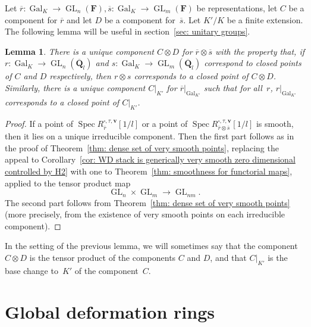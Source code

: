 \documentclass{amsart}
\renewcommand{\mathbb}{\mathbf}
\renewcommand{\ell}{l}
\newtheorem{lem}[subsubsection]{Lemma}
\theoremstyle{definition}
\theoremstyle{remark}
\newcommand{\mar}[1]{}
\newcommand{\mar}[1]{\marginpar{\raggedright\tiny squirrel #1}}
\newcommand{\F}{\FF}
\newcommand{\Q}{\QQ}
\newcommand{\FF}{{\mathbb F}}
\newcommand{\QQ}{{\mathbb Q}}
\newcommand{\Qbar}{\overline{\Q}}
\newcommand{\Qlbar}{\Qbar_{\ell}}
\DeclareMathOperator{\Gal}{Gal}
\DeclareMathOperator{\GL}{GL}
\DeclareMathOperator{\Spec}{Spec}
\newcommand{\rbar}{\overline{r}}
\newcommand{\sbar}{\overline{s}}
\begin{document}
Let $\rbar:\Gal_K\to\GL_n(\F),\sbar:\Gal_K\to\GL_m(\F)$ be representations, let $C$ be a
component for $\rbar$ and let $D$ be a component for~$\sbar$. Let
$K'/K$ be a finite extension. The following lemma will be useful in section~\ref{sec: unitary groups}.
\begin{lem}%
  \label{lem: operations on components make sense}There is a unique
  component $C\otimes D$ for $\rbar\otimes\sbar$ with the property
  that, if $r:\Gal_K\to\GL_n(\Qlbar)$ and $s:\Gal_K\to\GL_m(\Qlbar)$
  correspond to closed points of $C$ and $D$ respectively, then
  $r\otimes s$ corresponds to a closed point of
  $C\otimes D$. Similarly, there is a unique  component
  $C|_{K'}$ for $\rbar|_{\Gal_{K'}}$ such that for all~$r$, $r|_{\Gal_{K'}}$ corresponds
  to a closed point of $C|_{K'}$.
\end{lem}
\begin{proof}%
  If a point of $\Spec R_{\rbar}^{\square,\tau,\mathbf{v}}[1/l]$ or a point of $\Spec R_{\rbar\otimes \sbar}^{\square,\tau,\mathbf{v}}[1/l]$ is smooth, then it lies on a unique irreducible component.  Then the first part  follows as in the proof of Theorem~\ref{thm: dense
    set of very smooth points}, replacing the appeal to Corollary~\ref{cor: WD stack is generically very smooth zero dimensional
  controlled by H2} with one to Theorem~\ref{thm:
    smoothness for functorial maps}, applied to the tensor product map
  \[\GL_n\times\GL_m\to\GL_{nm}.\]  The second part follows from
  Theorem~\ref{thm: dense set of very smooth points} (more precisely,
  from the existence of very smooth points on each irreducible component).
\end{proof}%
In the setting of the previous lemma, we will sometimes say that the component
$C\otimes D$ is the tensor product of the components $C$ and $D$, and
that $C|_{K'}$ is the base change to~$K'$ of the component~$C$.%
\section{Global deformation rings}\label{sec: global deformation
  rings}%
\end{document}
